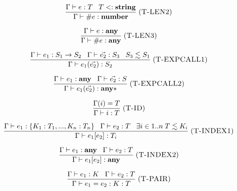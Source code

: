 \[
\frac{\Gamma \vdash e:T \;\;\;
      T <: \mathbf{string}}
     {\Gamma \vdash \# e : \mathbf{number}}
\; (\textsc{T-LEN2})
\]

\[
\frac{\Gamma \vdash e:\mathbf{any}}
     {\Gamma \vdash \# e : \mathbf{any}}
\; (\textsc{T-LEN3})
\]

\[
\frac{\Gamma \vdash e_{1}:S_{1} \rightarrow S_{2} \;\;\;
      \Gamma \vdash \vec{e_{2}}:S_{3} \;\;\;
      S_{3} \lesssim S_{1}}
     {\Gamma \vdash e_{1}(\vec{e_{2}}) : S_{2}}
\; (\textsc{T-EXPCALL1})
\]

\[
\frac{\Gamma \vdash e_{1}:\mathbf{any} \;\;\;
      \Gamma \vdash \vec{e_{2}}:S}
     {\Gamma \vdash e_{1}(\vec{e_{2}}) : \mathbf{any}{*}}
\; (\textsc{T-EXPCALL2})
\]

\[
\frac{\Gamma(i) = T}
     {\Gamma \vdash i : T}
\; (\textsc{T-ID})
\]

\[
\frac{\Gamma \vdash e_{1} : \{ K_{1}:T_{1}, ..., K_{n}:T_{n} \} \;\;\;
      \Gamma \vdash e_{2} : T \;\;\;
      \exists i \in 1..n \; T \lesssim K_{i}}
     {\Gamma \vdash e_{1}[e_{2}] : T_{i}}
\; (\textsc{T-INDEX1})
\]

\[
\frac{\Gamma \vdash e_{1}:\mathbf{any} \;\;\;
      \Gamma \vdash e_{2}:T}
     {\Gamma \vdash e_{1}[e_{2}] : \mathbf{any}}
\; (\textsc{T-INDEX2})
\]

\[
\frac{\Gamma \vdash e_{1} : K \;\;\;
      \Gamma \vdash e_{2} : T}
     {\Gamma \vdash e_{1} = e_{2} : K:T}
\; (\textsc{T-PAIR})
\]

